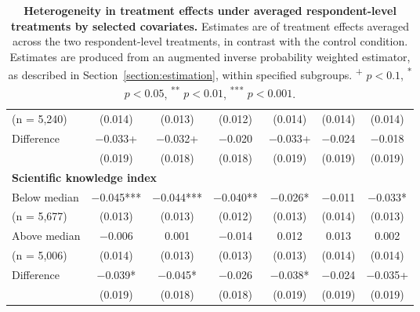 \documentclass[letterpaper, 12pt, parskip=full,DIV=10]{scrartcl}
\begin{document}
\begin{table}[H]
{\begin{tabular}{lcccccc}
\hspace{1.5em} (n = 5,240)  & (\num{0.014}) & (\num{0.013}) & (\num{0.012}) & (\num{0.014}) & (\num{0.014}) & (\num{0.014})\\
 \cmidrule(lr){2-7}
\hspace{1em} Difference & \num{-0.033}+ & \num{-0.032}+ & \num{-0.020} & \num{-0.033}+ & \num{-0.024} & \num{-0.018}\\
 & (\num{0.019}) & (\num{0.018}) & (\num{0.018}) & (\num{0.019}) & (\num{0.019}) & (\num{0.019})\\
 \multicolumn{4}{l}{\textbf{Scientific knowledge index }}  \rule{0pt}{1.2\normalbaselineskip}\\
\hspace{1em}   Below median  & \num{-0.045}*** & \num{-0.044}*** & \num{-0.040}** & \num{-0.026}* & \num{-0.011} & \num{-0.033}*\\
\hspace{1.5em} (n = 5,677)& (\num{0.013}) & (\num{0.013}) & (\num{0.012}) & (\num{0.013}) & (\num{0.014}) & (\num{0.013})\\
\hspace{1em}   Above median& \num{-0.006} & \num{0.001} & \num{-0.014} & \num{0.012} & \num{0.013} & \num{0.002}\\
\hspace{1.5em}  (n = 5,006) & (\num{0.014}) & (\num{0.013}) & (\num{0.013}) & (\num{0.013}) & (\num{0.014}) & (\num{0.014})\\
 \cmidrule(lr){2-7}
\hspace{1em}   Difference & \num{-0.039}* & \num{-0.045}* & \num{-0.026} & \num{-0.038}* & \num{-0.024} & \num{-0.035}+\\
 & (\num{0.019}) & (\num{0.018}) & (\num{0.018}) & (\num{0.019}) & (\num{0.019}) & (\num{0.019})\\
    \end{tabular}
   }
   \caption{\textbf{Heterogeneity in treatment effects under averaged respondent-level treatments by selected covariates.} Estimates are of treatment effects averaged across the two respondent-level treatments, in contrast with the control condition. Estimates are produced from an augmented inverse probability weighted estimator, as described in Section~\ref{section:estimation}, within specified subgroups. \textsuperscript{+} $p<0.1$, \textsuperscript{*} $p < 0.05$, \textsuperscript{**} $p < 0.01$, \textsuperscript{***} $p < 0.001$.}
  \label{tab:heterogeneity_treatment}
\end{table}
\end{document}
